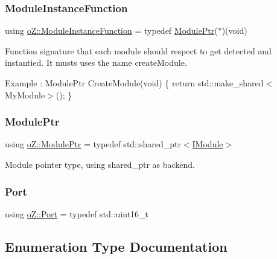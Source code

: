 \mbox{\label{namespaceo_z_ac1fa0fdab4bd08a5e127651d1f4150a2}} 
\subsubsection{\texorpdfstring{ModuleInstanceFunction}{ModuleInstanceFunction}}
{\footnotesize\ttfamily using \mbox{\hyperlink{namespaceo_z_ac1fa0fdab4bd08a5e127651d1f4150a2}{o\+Z\+::\+Module\+Instance\+Function}} = typedef \mbox{\hyperlink{namespaceo_z_af5a56aaaee027504979038f38991adcf}{Module\+Ptr}}($\ast$)(void)}



Function signature that each module should respect to get detected and instantied. It musts uses the name \textquotesingle{}create\+Module\textquotesingle{}. 

Example \+: Module\+Ptr Create\+Module(void) \{ return std\+::make\+\_\+shared$<$\+My\+Module$>$(); \} \mbox{\label{namespaceo_z_af5a56aaaee027504979038f38991adcf}} 
\subsubsection{\texorpdfstring{ModulePtr}{ModulePtr}}
{\footnotesize\ttfamily using \mbox{\hyperlink{namespaceo_z_af5a56aaaee027504979038f38991adcf}{o\+Z\+::\+Module\+Ptr}} = typedef std\+::shared\+\_\+ptr$<$\mbox{\hyperlink{classo_z_1_1_i_module}{I\+Module}}$>$}



Module pointer type, using shared\+\_\+ptr as backend. 

\mbox{\label{namespaceo_z_afeccb82d451972ba3b7d2a32b066b30b}} 
\subsubsection{\texorpdfstring{Port}{Port}}
{\footnotesize\ttfamily using \mbox{\hyperlink{namespaceo_z_afeccb82d451972ba3b7d2a32b066b30b}{o\+Z\+::\+Port}} = typedef std\+::uint16\+\_\+t}



\subsection{Enumeration Type Documentation}
\mbox{\label{namespaceo_z_a72fc7662d5f07391ac6f0a5699014bfa}} 
